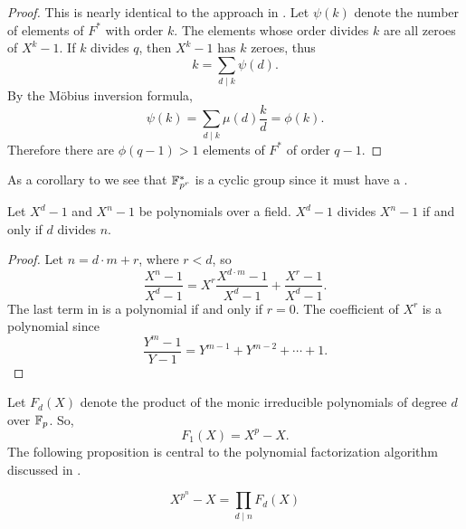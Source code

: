 \begin{proof}
This is nearly identical to the approach in
.  Let $\psi(k)$ denote the number of
elements of $F^{\ast}$ with order $k$.  The elements whose order
divides $k$ are all zeroes of $X^k - 1$.  If $k$ divides $q$, then $X^k
-1$ has $k$ zeroes, thus
\[
k = \sum_{d\mid k} \psi(d).
\]
By the M\"{o}bius inversion formula,
\[
\psi(k) = \sum_{d\mid k} \mu(d)\frac{k}{d} = \phi(k).
\]
Therefore there are $\phi(q-1) > 1$ elements of $F^{\ast}$ of order
$q-1$.
\end{proof}

As a corollary to  we see that $\mathbb{F}_{p^r}^{\ast}$
is a cyclic group since it must have a .

\begin{proposition}\label{Cycl:Factor:Prop}
Let $X^d-1$ and $X^n -1 $ be polynomials over a field.  $X^d-1$
divides $X^n-1$ if and only if $d$ divides $n$.
\end{proposition}

\begin{proof}
Let $n = d\cdot m + r$, where $r < d$, so
\begin{equation}\label{Cycl:Factor:Eq}
\frac{X^n -1}{X^d -1} = X^r \frac{X^{d\cdot m} -1}{X^d -1} +
\frac{X^r - 1}{X^d - 1}.
\end{equation}
The last term in  is a polynomial if and only if
$r = 0$.  The coefficient of $X^r$ is a polynomial since
\[
\frac{Y^m - 1}{Y-1} = Y^{m-1} + Y^{m-2} + \cdots + 1.
\]
\end{proof}

Let $F_d(X)$ denote the product of the monic irreducible polynomials of
degree $d$ over $\mathbb{F}_p$.  So,
\[
F_1(X) = X^p - X.
\]
The following proposition is central to the polynomial factorization
algorithm discussed in .

\begin{proposition}
\[
X^{p^n}- X = \prod_{d\mid n} F_d(X)
\]
\end{proposition}

